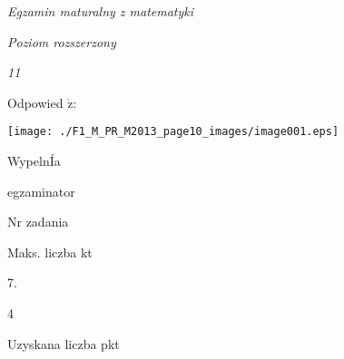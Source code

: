 \documentclass[a4paper,12pt]{article}
\begin{document}
{\it Egzamin maturalny z matematyki}

{\it Poziom rozszerzony}

{\it 11}

Odpowied $\acute{\mathrm{z}}$:
\begin{center}
\texttt{[image: ./F1\_M\_PR\_M2013\_page10\_images/image001.eps]}
\end{center}
WypelnÍa

egzaminator

Nr zadania

Maks. liczba kt

7.

4

Uzyskana liczba pkt
\end{document}
